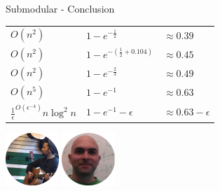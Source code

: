 \begin{frame}{Submodular - Conclusion}
    \begin{center}
        \Large
        \begin{tabular}{l l l}
            \hline
            $O(n^2)$
            &
            $1 - e^{-\frac{1}{2}}$
            &
            $\approx 0.39$
            \\
            \color{orange}$O(n^2)$
            &
            \color{orange}$1 - e^{-(\frac{1}{2} + 0.104)}$
            &
            $\approx 0.45$
            \\
            \color{orange}$O(n^2)$
            & 
            \color{orange}$1 - e^{-\frac{2}{3}}$ 
            &
            $\approx 0.49$
            \\
            $O(n^5)$
            & 
            $1 - e^{-1}$ 
            &
            $\approx 0.63$
            \\
            $\frac{1}{\epsilon}^{O(\epsilon^{-4})}n \log^2 n$
            & 
            $1 - e^{-1} - \epsilon$ 
            &
            $\approx 0.63 - \epsilon$
            \\
            \hline
        \end{tabular}
        
        \vfill
        
        \pause
        \includegraphics[height=2cm]{ariel.png}
        \includegraphics[height=2cm]{roy.png}
        
    \end{center}
\end{frame}